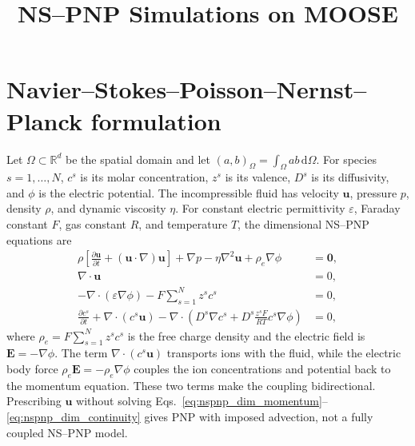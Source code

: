 \documentclass[3p,times]{elsarticle}
\begin{document}
\begin{frontmatter}

\title{NS--PNP Simulations on MOOSE}

\begin{abstract}
\end{abstract}

\end{frontmatter}

\section{Navier--Stokes--Poisson--Nernst--Planck formulation}

Let $\Omega \subset \mathbb{R}^d$ be the spatial domain and let $(a,b)_\Omega=\int_\Omega ab\,\mathrm{d}\Omega$. For species $s=1,\ldots,N$, $c^s$ is its molar concentration, $z^s$ is its valence, $D^s$ is its diffusivity, and $\phi$ is the electric potential. The incompressible fluid has velocity $\boldsymbol{u}$, pressure $p$, density $\rho$, and dynamic viscosity $\eta$. For constant electric permittivity $\varepsilon$, Faraday constant $F$, gas constant $R$, and temperature $T$, the dimensional NS--PNP equations are \citep{kim2024direct}
\begin{align}
  \rho\left[\frac{\partial\boldsymbol{u}}{\partial t}+(\boldsymbol{u}\cdot\nabla)\boldsymbol{u}\right]+\nabla p-\eta\nabla^2\boldsymbol{u}+\rho_e\nabla\phi&=\boldsymbol{0},
  \label{eq:nspnp_dim_momentum}\\
  \nabla\cdot\boldsymbol{u}&=0,
  \label{eq:nspnp_dim_continuity}\\
  -\nabla\cdot(\varepsilon\nabla\phi)-F\sum_{s=1}^{N}z^s c^s&=0,
  \label{eq:nspnp_dim_poisson}\\
  \frac{\partial c^s}{\partial t}+\nabla\cdot(c^s\boldsymbol{u})-\nabla\cdot\left(D^s\nabla c^s+D^s\frac{z^sF}{RT}c^s\nabla\phi\right)&=0,
  \label{eq:nspnp_dim_np}
\end{align}
where $\rho_e=F\sum_{s=1}^{N}z^s c^s$ is the free charge density and the electric field is $\boldsymbol{E}=-\nabla\phi$. The term $\nabla\cdot(c^s\boldsymbol{u})$ transports ions with the fluid, while the electric body force $\rho_e\boldsymbol{E}=-\rho_e\nabla\phi$ couples the ion concentrations and potential back to the momentum equation. These two terms make the coupling bidirectional. Prescribing $\boldsymbol{u}$ without solving Eqs.~\eqref{eq:nspnp_dim_momentum}--\eqref{eq:nspnp_dim_continuity} gives PNP with imposed advection, not a fully coupled NS--PNP model.
\end{document}
